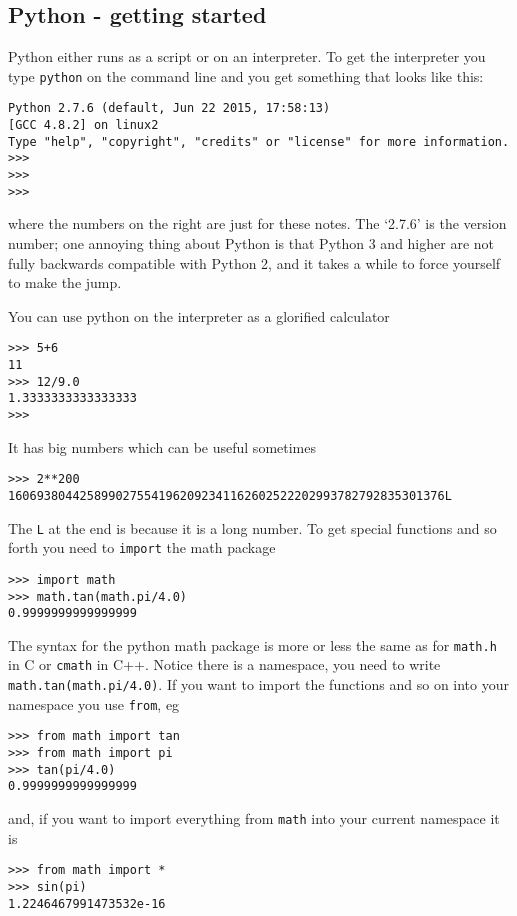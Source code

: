 \documentclass[12pt]{article}
\begin{document}
\subsection*{Python - getting started}
Python either runs as a script or on an interpreter. To get the
interpreter you type \texttt{python} on the command line and you get
something that looks like this:
\begin{lstlisting}[numbers=right]
Python 2.7.6 (default, Jun 22 2015, 17:58:13) 
[GCC 4.8.2] on linux2
Type "help", "copyright", "credits" or "license" for more information.
>>> 
>>> 
>>> 
\end{lstlisting}
where the numbers on the right are just for these notes. The
\lq{}2.7.6\rq{} is the version number; one annoying thing about Python
is that Python 3 and higher are not fully backwards compatible with
Python 2, and it takes a while to force yourself to make the jump.

You can use python on the interpreter as a glorified calculator
\begin{lstlisting}[numbers=right]
>>> 5+6
11
>>> 12/9.0
1.3333333333333333
>>> 
\end{lstlisting}
It has big numbers which can be useful sometimes
\begin{lstlisting}[numbers=right]
>>> 2**200
1606938044258990275541962092341162602522202993782792835301376L
\end{lstlisting}
The \texttt{L} at the end is because it is a long number. To get
special functions and so forth you need to \texttt{import} the math
package 
\begin{lstlisting}[numbers=right]
>>> import math
>>> math.tan(math.pi/4.0)
0.9999999999999999
\end{lstlisting}

The syntax for the python math package is more or less the same as for
\texttt{math.h} in C or \texttt{cmath} in C++. Notice there is a namespace,
you need to write \texttt{math.tan(math.pi/4.0)}. If you want to
import the functions and so on into your namespace you use
\texttt{from}, eg
\begin{lstlisting}[numbers=right]
>>> from math import tan 
>>> from math import pi
>>> tan(pi/4.0)
0.9999999999999999
\end{lstlisting}
and, if you want to import everything from \texttt{math} into your current namespace it is 
\begin{lstlisting}[numbers=right]
>>> from math import *
>>> sin(pi)
1.2246467991473532e-16
\end{lstlisting}
\end{document}
